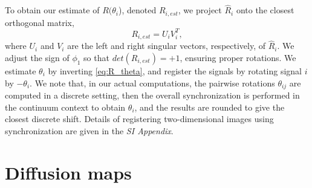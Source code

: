 \documentclass{pnastwo}
\begin{document}
\begin{article}
\begin{materials}
%
To obtain our estimate of $R(\theta_i$), denoted $R_{i, est}$, we project $\hat{R}_i$ onto the closest orthogonal matrix, 
\begin{equation} \label{eq:R_est}
R_{i, est} = U_i V_i^T,
\end{equation}
where $U_i$ and $V_i$ are the left and right singular vectors, respectively, of $\hat{R}_i$.
%
We adjust the sign of $\phi_1$ so that $det(R_{i, est}) = +1$, ensuring proper rotations.
%
We estimate $\theta_{i}$ by inverting \eqref{eq:R_theta}, and register the signals by rotating signal $i$ by $-\theta_i$.
%
We note that, in our actual computations, the pairwise rotations $\theta_{ij}$ are computed in a discrete setting, then the overall
synchronization is performed in the continuum context to obtain $\theta_i$, and the results are rounded to give the closest
discrete shift.
%
Details of registering two-dimensional images using synchronization are given in the {\it SI Appendix}. 

%
%
%

\section{Diffusion maps \cite{coifman2005geometric}}


\end{materials}
\end{article}
\end{document}
